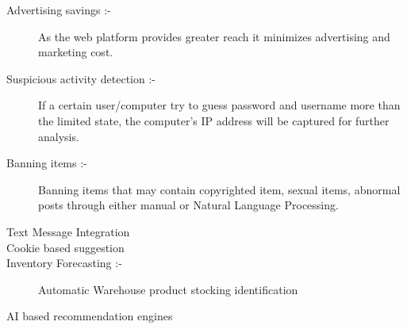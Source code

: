 \begin{description}
	\item[Advertising savings :-] As the web platform provides greater reach it minimizes advertising and marketing cost.
	\item[Suspicious activity detection :-] If a certain user/computer try to guess password and username more than the limited state, the computer's IP address will be captured for further analysis.
	\item[Banning items :-] Banning items that may contain copyrighted item, sexual items, abnormal posts through either manual or Natural Language Processing.
	\item[Text Message Integration]
	\item[Cookie based suggestion]
	\item[Inventory Forecasting :-] Automatic Warehouse product stocking identification
	\item[AI based recommendation engines]
\end{description}

